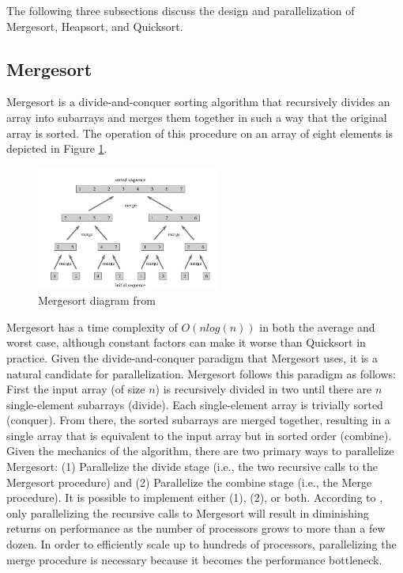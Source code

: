 \documentclass[conference]{IEEEtran}
\begin{document}
    The following three subsections discuss the design and parallelization of Mergesort, Heapsort, and Quicksort.
    
    \subsection{Mergesort}
    Mergesort is a divide-and-conquer sorting algorithm that recursively divides an array into subarrays and merges them together in such a way that the original array is sorted. 
    The operation of this procedure on an array of eight elements is depicted in Figure \ref{mrg}.  
    \begin{figure}[h]
        \includegraphics[width=6cm]{merge.png} 
        \caption{Mergesort diagram from \cite{cormen_introduction_2009}}
        \label{mrg}
    \end{figure}
    Mergesort has a time complexity of $O(nlog(n))$ in both the average and worst case, although constant factors can make it worse than Quicksort in practice. 
    Given the divide-and-conquer paradigm that Mergesort uses, it is a natural candidate for parallelization. Mergesort follows this paradigm as follows: First the input array (of size $n$) is recursively divided in two until there are $n$ single-element subarrays (divide). Each single-element array is trivially sorted (conquer). From there, the sorted subarrays are merged together, resulting in a single array that is equivalent to the input array but in sorted order (combine). Given the mechanics of the algorithm, there are two primary ways to parallelize Mergesort: (1) Parallelize the divide stage (i.e., the two recursive calls to the Mergesort procedure) and (2) Parallelize the combine stage (i.e., the Merge procedure). It is possible to implement either (1), (2), or both. According to \cite{cormen_introduction_2009}, only parallelizing the recursive calls to Mergesort will result in diminishing returns on performance as the number of processors grows to more than a few dozen. In order to efficiently scale up to hundreds of processors, parallelizing the merge procedure is necessary because it becomes the performance bottleneck.
\end{document}
